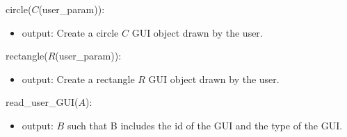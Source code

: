 \documentclass[12pt, titlepage]{article}
\begin{document}
\noindent circle($C$(user{\_}param)):
\begin{itemize}
\item output: Create a circle $C$ GUI object drawn by the user.
\end{itemize}

\noindent rectangle($R$(user{\_}param)):
\begin{itemize}
\item output: Create a rectangle $R$ GUI object drawn by the user. 
\end{itemize}

\noindent read{\_}user{\_}GUI($A$):
\begin{itemize}
\item output:  $B$ such that B includes the id of the GUI and the type of the 
GUI.
\end{itemize}
\bigskip

\newpage



\end{document}
